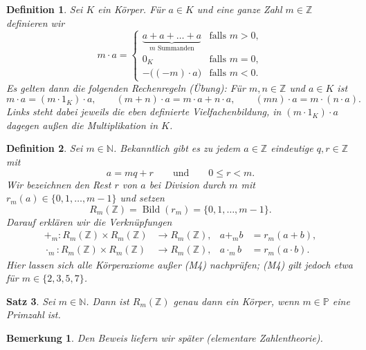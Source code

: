 \documentclass[a4paper]{article}
\theoremstyle{kurzskript}
\newtheorem{satz}{Satz}[section]             %
\newtheorem{definition}[satz]{Definition}
\newtheorem*{bem}{Bemerkung}
\newcommand{\N}{\mathbb{N}}
\newcommand{\Z}{\mathbb{Z}}
\newcommand{\Pm}{\mathbb{P}}
\begin{document}
\begin{definition}
Sei $K$ ein Körper. Für $a \in K$ und eine ganze Zahl $m \in \Z$ definieren wir
\[
  m \cdot a =
  \begin{cases}
    \underbrace{a + a + \dots + a}_{m \text{ Summanden}} & \text{falls } m > 0,\\
    0_K & \text{falls } m = 0,\\
    -\bigl((-m) \cdot a\bigr) & \text{falls } m < 0.
  \end{cases}
\]
Es gelten dann die folgenden Rechenregeln (Übung): Für $m, n \in \Z$ und $a \in K$ ist
\[
  m \cdot a = (m \cdot 1_K) \cdot a, \qquad (m + n) \cdot a = m \cdot a + n \cdot a, \qquad (mn) \cdot a = m \cdot (n \cdot a).
\]
Links steht dabei jeweils die eben definierte Vielfachenbildung, in $(m \cdot 1_K) \cdot a$ dagegen außen die Multiplikation in $K$.
\end{definition}

\begin{definition}
Sei $m \in \N$. Bekanntlich gibt es zu jedem $a \in \Z$ eindeutige $q, r \in \Z$ mit
\[
  a = mq + r \qquad\text{und}\qquad 0 \leq r < m.
\]
Wir bezeichnen den Rest $r$ von $a$ bei Division durch $m$ mit $r_m(a) \in \{0, 1, \dots, m - 1\}$ und setzen
\[
  R_m(\Z) = \operatorname{Bild}(r_m) = \{0, 1, \dots, m - 1\}.
\]
Darauf erklären wir die Verknüpfungen
\begin{align*}
  +_m\colon R_m(\Z) \times R_m(\Z) &\to R_m(\Z), & a +_m b &= r_m(a + b),\\
  \cdot_m\colon R_m(\Z) \times R_m(\Z) &\to R_m(\Z), & a \cdot_m b &= r_m(a \cdot b).
\end{align*}
Hier lassen sich alle Körperaxiome außer (M4) nachprüfen; (M4) gilt jedoch etwa für $m \in \{2, 3, 5, 7\}$.
\end{definition}

\begin{satz}
Sei $m \in \N$. Dann ist $R_m(\Z)$ genau dann ein Körper, wenn $m \in \Pm$ eine Primzahl ist.
\end{satz}

\begin{bem}
Den Beweis liefern wir später (elementare Zahlentheorie).
\end{bem}
\end{document}

